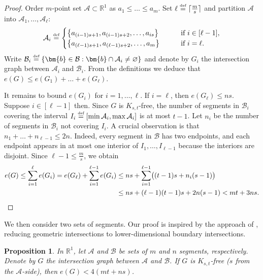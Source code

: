 \documentclass[11pt]{article}
\newtheorem{proposition}[theorem]{Proposition}
\theoremstyle{definition}
\newcommand*{\eqdef}{\stackrel{\mbox{\normalfont\tiny def}}{=}} %
\newcommand*{\R}{\mathbb{R}}                                    %
\newcommand*{\cB}{\mathcal{B}}
\newcommand*{\cA}{\mathcal{A}}
\begin{document}
\begin{proof}
    

    Order $m$-point set $\cA \subset \R^1$ as $a_1 \le \dots \le a_m$. Set $\ell \eqdef \lceil \frac{m}{s} \rceil$ and partition $\cA$ into $\cA_1, \dots, \cA_\ell$:
    \[
    \cA_i \eqdef \begin{cases}
        \bigl\{ a_{(i-1)s+1}, a_{(i-1)s+2}, \dots, a_{is} \bigr\} \qquad &\text{if $i \in [\ell-1]$}, \\
        \bigl\{ a_{(\ell-1)s+1}, a_{(\ell-1)s+2}, \dots, a_m \bigr\} \qquad &\text{if $i = \ell$}. 
    \end{cases}
    \]
    Write $\cB_i \eqdef \{\bm{b} \in \cB : \bm{b} \cap \cA_i \ne \varnothing\}$ and denote by $G_i$ the intersection graph between $\cA_i$ and $\cB_i$. From the definitions we deduce that $e(G) \le e(G_1) + \dots + e(G_{\ell})$. 

    It remains to bound $e(G_i)$ for $i = 1, \dots, \ell$. If $i = \ell$, then $e(G_{\ell}) \le ns$. Suppose $i \in [\ell-1]$ then. Since $G$ is $K_{s, t}$-free, the number of segments in $\cB_i$ covering the interval $I_i \eqdef [\min\cA_i, \max\cA_i]$ is at most $t - 1$. Let $n_i$ be the number of segments in $\cB_i$ not covering $I_i$. A crucial observation is that $n_1 + \dots + n_{\ell-1} \le 2n$. Indeed, every segment in $\cB$ has two endpoints, and each endpoint appears in at most one interior of $I_1, \dots, I_{\ell-1}$ because the interiors are disjoint. Since $\ell - 1 \le \frac{m}{s}$, we obtain
    \begin{align*}
        e(G) \le \sum_{i=1}^{\ell} e(G_i) = e(G_{\ell}) + \sum_{i=1}^{\ell-1} e(G_i) &\le ns + \sum_{i=1}^{\ell-1} \bigl( (t-1)s + n_i(s-1) \bigr) \\
        &\le ns + (\ell-1)(t-1)s + 2n(s-1) < mt + 3ns. \qedhere
    \end{align*}
\end{proof}

We then consider two sets of segments. Our proof is inspired by the approach of \cite[Theorem~7]{keller_smorodinsky}, reducing geometric intersections to lower-dimensional boundary intersections. 

\begin{proposition} \label{prop:segment_segment}
    In $\R^1$, let $\cA$ and $\cB$ be sets of $m$ and $n$ segments, respectively. Denote by $G$ the intersection graph between $\cA$ and $\cB$. If $G$ is $K_{s, t}$-free ($s$ from the $\cA$-side), then $e(G) < 4(mt + ns)$. 
\end{proposition}
\end{document}
